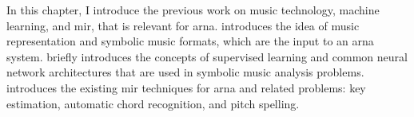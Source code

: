 

In this chapter, I introduce the previous work on music
technology, machine learning, and \gls{mir}, that is
relevant for \gls{arna}. 
introduces the idea of music representation and symbolic
music formats, which are the input to an \gls{arna} system.
 briefly introduces the concepts
of supervised learning and common neural network
architectures that are used in symbolic music analysis
problems.  introduces the
existing \gls{mir} techniques for \gls{arna} and related
problems: key estimation, automatic chord recognition, and
pitch spelling.
